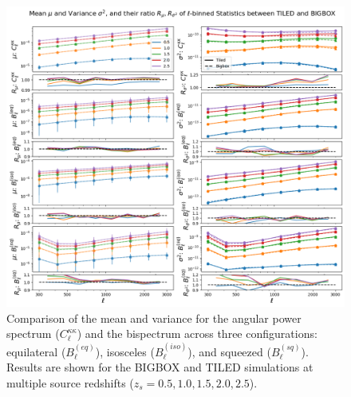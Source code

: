 \begin{figure}[ht]
    \centering
    \includegraphics[width=\textwidth]{figures/results/ell_main.png}
    \caption[Comparison of Mean and Variance for $C^{\kappa\kappa}_{\ell}$ and Bispectrum]
    {Comparison of the mean and variance for the angular power spectrum ($C^{\kappa\kappa}_{\ell}$) and the bispectrum across three configurations: equilateral ($B_{\ell}^{(eq)}$), isosceles ($B_{\ell}^{(iso)}$), and squeezed ($B_{\ell}^{(sq)}$). Results are shown for the BIGBOX and TILED simulations at multiple source redshifts ($z_s = 0.5, 1.0, 1.5, 2.0, 2.5$).}
    \label{fig:ell_main}
\end{figure}

